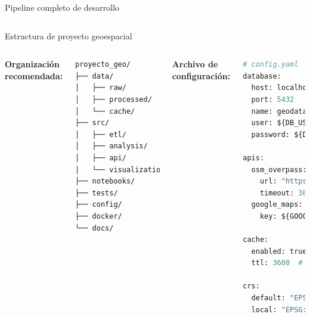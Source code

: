 \documentclass[10pt,aspectratio=169]{beamer}
\begin{document}
\begin{frame}{Pipeline completo de desarrollo}
\begin{columns}[T]
\begin{center}
        \end{center}
    \end{columns}
\end{frame}

\begin{frame}[fragile]{Estructura de proyecto geoespacial}
    \begin{columns}[T]
        \textbf{Organización recomendada:}
        \begin{lstlisting}[language=bash]
proyecto_geo/
├── data/
│   ├── raw/           # Datos originales
│   ├── processed/     # Datos limpios
│   └── cache/         # Resultados cache
├── src/
│   ├── etl/          # Extract-Transform-Load
│   ├── analysis/     # Análisis espacial
│   ├── api/          # REST API
│   └── visualization/ # Mapas y gráficos
├── notebooks/        # Jupyter notebooks
├── tests/           # Tests unitarios
├── config/          # Configuración
├── docker/          # Contenedores
└── docs/           # Documentación
        \end{lstlisting}
        
        \textbf{Archivo de configuración:}
        \begin{lstlisting}[language=Python]
# config.yaml
database:
  host: localhost
  port: 5432
  name: geodatabase
  user: ${DB_USER}
  password: ${DB_PASS}

apis:
  osm_overpass: 
    url: "https://overpass-api.de"
    timeout: 30
  google_maps:
    key: ${GOOGLE_API_KEY}
    
cache:
  enabled: true
  ttl: 3600  # segundos
  
crs:
  default: "EPSG:4326"
  local: "EPSG:32719"  # UTM 19S
        \end{lstlisting}
    \end{columns}
\end{frame}
\end{document}
